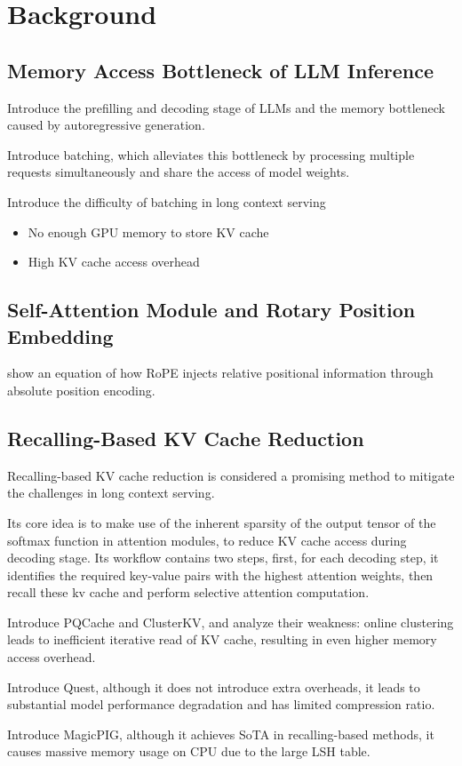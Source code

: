 \section{Background}

\subsection{Memory Access Bottleneck of LLM Inference}

Introduce the prefilling and decoding stage of LLMs and the memory bottleneck caused by autoregressive generation.

Introduce batching, which alleviates this bottleneck by processing multiple requests simultaneously and share the access of model weights.

Introduce the difficulty of batching in long context serving

\begin{itemize}
    \item No enough GPU memory to store KV cache
    \item High KV cache access overhead
\end{itemize}

\subsection{Self-Attention Module and Rotary Position Embedding}

show an equation of how RoPE injects relative positional information through absolute position encoding.

\subsection{Recalling-Based KV Cache Reduction}

Recalling-based KV cache reduction is considered a promising method to mitigate the challenges in long context serving.

Its core idea is to make use of the inherent sparsity of the output tensor of the softmax function in attention modules, to reduce KV cache access during decoding stage. Its workflow contains two steps, first, for each decoding step, it identifies the required key-value pairs with the highest attention weights, then recall these kv cache and perform selective attention computation.

Introduce PQCache and ClusterKV, and analyze their weakness: online clustering leads to inefficient iterative read of KV cache, resulting in even higher memory access overhead.

Introduce Quest, although it does not introduce extra overheads, it leads to substantial model performance degradation and has limited compression ratio.

Introduce MagicPIG, although it achieves SoTA in recalling-based methods, it causes massive memory usage on CPU due to the large LSH table.

